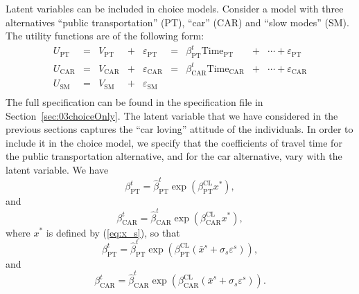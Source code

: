 \documentclass[12pt,a4paper]{article}
\newcommand{\req}[1]{(\ref{#1})}
\begin{document}
Latent variables can be included in choice models. Consider a model
with three alternatives ``public transportation'' (PT), ``car'' (CAR)
and ``slow modes'' (SM). The utility functions are of the following form:
\begin{equation}
\label{eq:utility}
\begin{array}{rclclclcl}
U_{\text{PT}} &=& V_{\text{PT}} &+& \varepsilon_{\text{PT}} &=& \beta^t_\text{PT} \text{Time}_\text{PT} &+& \cdots + \varepsilon_{\text{PT}}\\
U_{\text{CAR}} &=&V_{\text{CAR}}&+& \varepsilon_{\text{CAR}} &=& \beta^t_\text{CAR} \text{Time}_\text{CAR} &+& \cdots
+ \varepsilon_{\text{CAR}}\\
U_{\text{SM}} &=&V_{\text{SM}} &+& \varepsilon_{\text{SM}}\\
\end{array}
\end{equation}
The full specification can be found in the specification
file in Section~\ref{sec:03choiceOnly}. 
 The
latent variable that we have considered in the previous sections captures the ``car loving'' attitude of the
individuals. In order to include it in the choice model, we specify that the coefficients
of travel time for the public transportation alternative, and for the
car alternative, vary with the latent variable. We have
\begin{equation}
\label{eq:beta_pt}
\beta^t_\text{PT} = \widehat{\beta}^t_\text{PT}
\exp(\beta^\text{CL}_\text{PT} x^*),
\end{equation}
and
\begin{equation}
\label{eq:beta_car}
\beta^t_\text{CAR} = \widehat{\beta}^t_\text{CAR}
\exp(\beta^\text{CL}_\text{CAR} x^*),
\end{equation}
where $x^*$ is defined by \req{eq:x_s}, so that
\begin{equation}
\beta^t_\text{PT} = \widehat{\beta}^t_\text{PT}
\exp(\beta^\text{CL}_\text{PT} (\bar{x}^s + \sigma_s \varepsilon^s)),
\end{equation}
and
\begin{equation}
\beta^t_\text{CAR} = \widehat{\beta}^t_\text{CAR}
\exp(\beta^\text{CL}_\text{CAR}(\bar{x}^s + \sigma_s \varepsilon^s)).
\end{equation}
\end{document}
